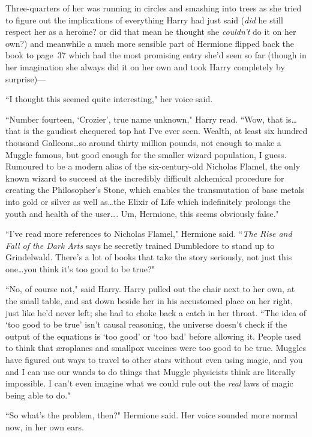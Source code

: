 Three-quarters of her was running in circles and smashing into trees as she tried to figure out the implications of everything Harry had just said (\emph{did} he still respect her as a heroine? or did that mean he thought she \emph{couldn't} do it on her own?) and meanwhile a much more sensible part of Hermione flipped back the book to page~37 which had the most promising entry she'd seen so far (though in her imagination she always did it on her own and took Harry completely by surprise)—

``I thought this seemed quite interesting," her voice said.

``Number fourteen, `Crozier', true name unknown," Harry read. ``Wow, that is…that is the gaudiest chequered top hat I've ever seen. Wealth, at least six hundred thousand Galleons…so around thirty million pounds, not enough to make a Muggle famous, but good enough for the smaller wizard population, I guess. Rumoured to be a modern alias of the six-century-old Nicholas Flamel, the only known wizard to succeed at the incredibly difficult alchemical procedure for creating the Philosopher's Stone, which enables the transmutation of base metals into gold or silver as well as…the Elixir of Life which indefinitely prolongs the youth and health of the user…. Um, Hermione, this seems obviously false."

``I've read more references to Nicholas Flamel," Hermione said. ``\emph{The Rise and Fall of the Dark Arts} says he secretly trained Dumbledore to stand up to Grindelwald. There's a lot of books that take the story seriously, not just this one…you think it's too good to be true?"

``No, of course not," said Harry. Harry pulled out the chair next to her own, at the small table, and sat down beside her in his accustomed place on her right, just like he'd never left; she had to choke back a catch in her throat. ``The idea of `too good to be true' isn't causal reasoning, the universe doesn't check if the output of the equations is `too good' or `too bad' before allowing it. People used to think that æroplanes and smallpox vaccines were too good to be true. Muggles have figured out ways to travel to other stars without even using magic, and you and I can use our wands to do things that Muggle physicists think are literally impossible. I can't even imagine what we could rule out the \emph{real} laws of magic being able to do."

``So what's the problem, then?" Hermione said. Her voice sounded more normal now, in her own ears.

